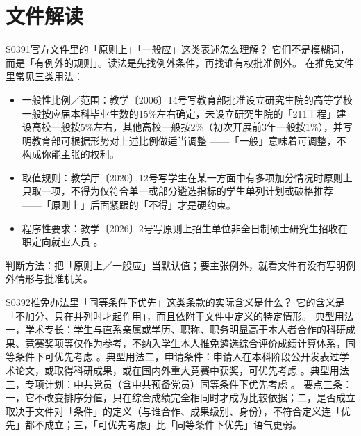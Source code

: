 \section{文件解读}
\begin{qa}{S0391}{官方文件里的「原则上」「一般应」这类表述怎么理解？}
它们不是模糊词，而是「有例外的规则」。读法是先找例外条件，再找谁有权批准例外。
在推免文件里常见三类用法：
\begin{itemize}
  \item 一般性比例／范围：教学〔2006〕14号写教育部批准设立研究生院的高等学校一般按应届本科毕业生数的15\%左右确定，未设立研究生院的「211工程」建设高校一般按5\%左右，其他高校一般按2\%（初次开展前3年一般按1\%），并写明教育部可根据形势对上述比例做适当调整 ——「一般」意味着可调整，不构成你能主张的权利。
  \item 取值规则：教学厅〔2020〕12号写学生在某一方面中有多项加分情况时原则上只取一项，不得为仅符合单一或部分遴选指标的学生单列计划或破格推荐 ——「原则上」后面紧跟的「不得」才是硬约束。
  \item 程序性要求：教学〔2026〕2号写原则上招生单位非全日制硕士研究生招收在职定向就业人员 。
\end{itemize}
判断方法：把「原则上／一般应」当默认值；要主张例外，就看文件有没有写明例外情形与批准机关。
\end{qa}

\begin{qa}{S0392}{推免办法里「同等条件下优先」这类条款的实际含义是什么？}
它的含义是「不加分、只在并列时才起作用」，而且依附于文件中定义的特定情形。
典型用法一，学术专长：学生与直系亲属或学历、职称、职务明显高于本人者合作的科研成果、竞赛奖项等仅作为参考，不纳入学生本人推免遴选综合评价成绩计算体系，同等条件下可优先考虑 。典型用法二，申请条件：申请人在本科阶段公开发表过学术论文，或取得科研成果，或在国内外重大竞赛中获奖，可优先考虑 。典型用法三，专项计划：中共党员（含中共预备党员）同等条件下优先考虑 。
要点三条：一，它不改变排序分值，只在综合成绩完全相同时才成为比较依据；二，是否成立取决于文件对「条件」的定义（与谁合作、成果级别、身份），不符合定义连「优先」都不成立；三，「可优先考虑」比「同等条件下优先」语气更弱。
\end{qa}

